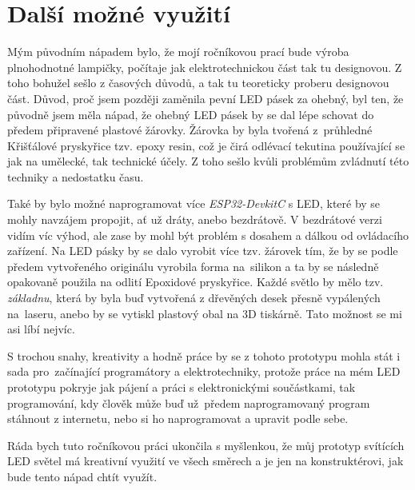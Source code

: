 \chapter{Další možné využití}

Mým původním nápadem bylo, že mojí ročníkovou prací bude výroba plnohodnotné lampičky, počítaje jak elektrotechnickou část tak tu designovou. Z toho bohužel sešlo z časových důvodů, a tak tu teoreticky proberu designovou část. 
Důvod, proč jsem později zaměnila pevní LED pásek za ohebný, byl ten, že původně jsem měla nápad, že ohebný LED pásek by se dal lépe schovat do předem připravené plastové žárovky. 
Žárovka by byla tvořená z~průhledné Křišťálové pryskyřice tzv. epoxy resin\cite{epoxyresin}, což je čirá odlévací tekutina používající se jak na umělecké, tak technické účely. Z toho sešlo kvůli problémům zvládnutí této techniky a nedostatku času. 



Také by bylo možné naprogramovat více \textit{ESP32-DevkitC} s LED, které by se mohly navzájem propojit, ať už dráty, anebo bezdrátově. V bezdrátové verzi vidím víc výhod, ale zase by mohl být problém s dosahem a dálkou od ovládacího zařízení. 
Na LED pásky by se dalo vyrobit více tzv. žárovek tím, že by se podle předem vytvořeného originálu vyrobila forma na~silikon a ta by se následně opakovaně použila na odlití Epoxidové pryskyřice. Každé světlo by mělo tzv. {\em základnu}, která by byla buď vytvořená z dřevěných desek přesně vypálených na~laseru, anebo by se vytiskl plastový obal na 3D tiskárně. Tato možnost se mi asi líbí nejvíc.

	

S trochou snahy, kreativity a hodně práce by se z tohoto prototypu mohla stát i sada pro~začínající programátory a elektrotechniky, protože práce na mém LED prototypu pokryje jak pájení a práci s elektronickými součástkami, tak programování, kdy člověk může buď už~předem naprogramovaný program stáhnout z internetu, nebo si ho naprogramovat a upravit podle sebe. 

Ráda bych tuto ročníkovou práci ukončila s myšlenkou, že můj prototyp svítících LED světel má kreativní využití ve všech směrech a je jen na konstruktérovi, jak bude tento nápad chtít využít. 


